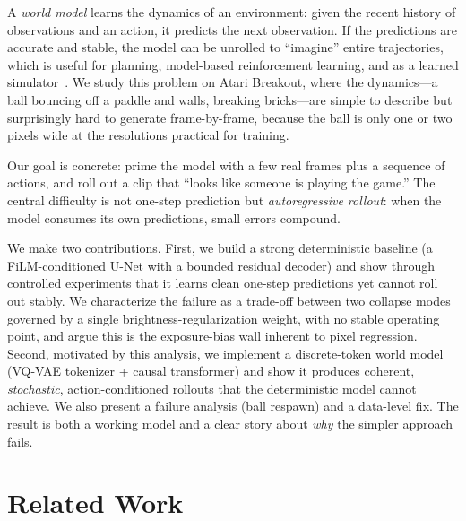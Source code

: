 \documentclass[10pt,twocolumn,letterpaper]{article}
\begin{document}
A \emph{world model} learns the dynamics of an environment: given the recent
history of observations and an action, it predicts the next observation. If the
predictions are accurate and stable, the model can be unrolled to ``imagine''
entire trajectories, which is useful for planning, model-based reinforcement
learning, and as a learned simulator~\cite{ha2018worldmodels,hafner2020dreamer}.
We study this problem on Atari Breakout, where the dynamics---a ball bouncing off
a paddle and walls, breaking bricks---are simple to describe but surprisingly
hard to generate frame-by-frame, because the ball is only one or two pixels wide
at the resolutions practical for training.

Our goal is concrete: prime the model with a few real frames plus a sequence of
actions, and roll out a clip that ``looks like someone is playing the game.''
The central difficulty is not one-step prediction but \emph{autoregressive
rollout}: when the model consumes its own predictions, small errors compound.

We make two contributions. First, we build a strong deterministic baseline (a
FiLM-conditioned U-Net with a bounded residual decoder) and show through
controlled experiments that it learns clean one-step predictions yet cannot roll
out stably. We characterize the failure as a trade-off between two collapse
modes governed by a single brightness-regularization weight, with no stable
operating point, and argue this is the exposure-bias wall inherent to pixel
regression. Second, motivated by this analysis, we implement a discrete-token
world model (VQ-VAE tokenizer + causal transformer) and show it produces
coherent, \emph{stochastic}, action-conditioned rollouts that the deterministic
model cannot achieve. We also present a failure analysis (ball respawn) and a
data-level fix. The result is both a working model and a clear story about
\emph{why} the simpler approach fails.

\section{Related Work}
\end{document}

